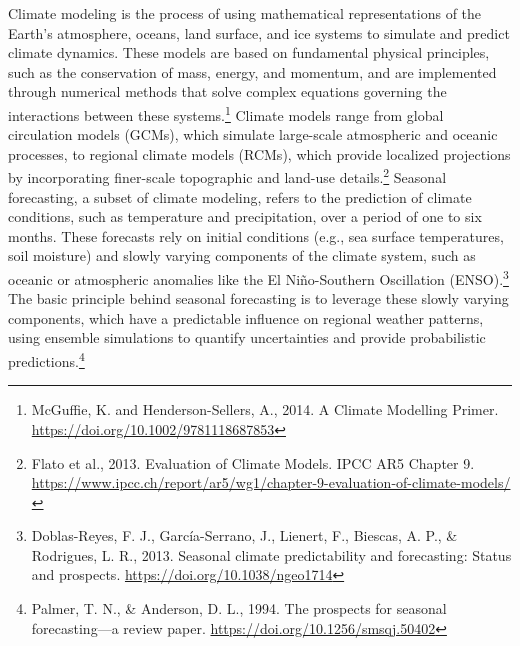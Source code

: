 Climate modeling is the process of using mathematical representations of the Earth’s atmosphere, oceans, land surface, and ice systems to simulate and predict climate dynamics. These models are based on fundamental physical principles, such as the conservation of mass, energy, and momentum, and are implemented through numerical methods that solve complex equations governing the interactions between these systems.\footnote{McGuffie, K. and Henderson-Sellers, A., 2014. A Climate Modelling Primer. \url{https://doi.org/10.1002/9781118687853}} Climate models range from global circulation models (GCMs), which simulate large-scale atmospheric and oceanic processes, to regional climate models (RCMs), which provide localized projections by incorporating finer-scale topographic and land-use details.\footnote{Flato et al., 2013. Evaluation of Climate Models. IPCC AR5 Chapter 9. \url{https://www.ipcc.ch/report/ar5/wg1/chapter-9-evaluation-of-climate-models/}} Seasonal forecasting, a subset of climate modeling, refers to the prediction of climate conditions, such as temperature and precipitation, over a period of one to six months. These forecasts rely on initial conditions (e.g., sea surface temperatures, soil moisture) and slowly varying components of the climate system, such as oceanic or atmospheric anomalies like the El Niño-Southern Oscillation (ENSO).\footnote{Doblas-Reyes, F. J., García-Serrano, J., Lienert, F., Biescas, A. P., \& Rodrigues, L. R., 2013. Seasonal climate predictability and forecasting: Status and prospects. \url{https://doi.org/10.1038/ngeo1714}} The basic principle behind seasonal forecasting is to leverage these slowly varying components, which have a predictable influence on regional weather patterns, using ensemble simulations to quantify uncertainties and provide probabilistic predictions.\footnote{Palmer, T. N., \& Anderson, D. L., 1994. The prospects for seasonal forecasting—a review paper. \url{https://doi.org/10.1256/smsqj.50402}}  

